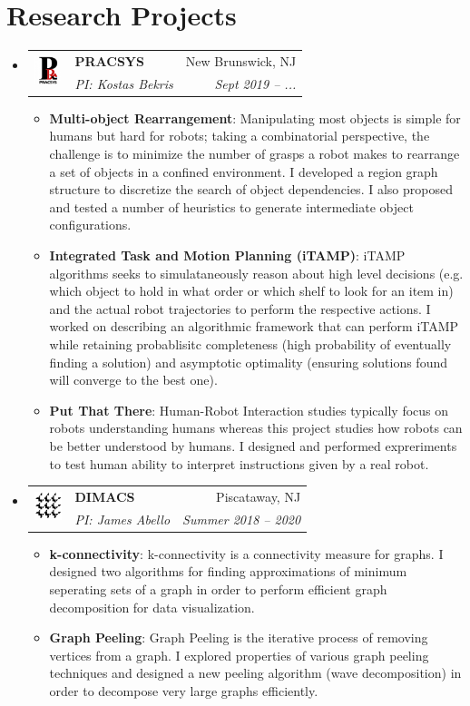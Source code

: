 \documentclass[letterpaper,11pt]{article}
\makeatletter
\newcommand{\resumeItem}[2]{
\item\small{
		\textbf{#1}{: #2 \vspace{-2pt}}
	}
}
\newcommand{\resumeSubheading}[5]{
	\vspace{-1pt}\item
	\begin{tabular*}{0.97\textwidth}[t]{ll@{\extracolsep{\fill}}r}
		\multirow{2}{*}{#1} & \textbf{#2} & #3 \\
				    & \textit{\small#4} & \textit{\small #5} \\
	\end{tabular*}\vspace{-5pt}
}
\newcommand{\resumeSubHeadingListStart}{\begin{itemize}[leftmargin=*,label=]}
\newcommand{\resumeSubHeadingListEnd}{\end{itemize}}
\newcommand{\resumeItemListStart}{\begin{itemize}[label=$\bullet$]}
\newcommand{\resumeItemListEnd}{\end{itemize}\vspace{-5pt}}
\makeatother
\begin{document}
\section{Research Projects}
\resumeSubHeadingListStart
\resumeSubheading
{\includegraphics[width=23pt]{./images/pracsys.png}}
{PRACSYS}{New Brunswick, NJ}
{PI: Kostas Bekris}{Sept 2019 -- ...}
\resumeItemListStart
\resumeItem{Multi-object Rearrangement}
{Manipulating most objects is simple for humans but hard for robots; taking a combinatorial perspective, the challenge is to minimize the number of grasps a robot makes to rearrange a set of objects in a confined environment. I developed a region graph structure to discretize the search of object dependencies. I also proposed and tested a number of heuristics to generate intermediate object configurations.}
\resumeItem{Integrated Task and Motion Planning (iTAMP)}
{iTAMP algorithms seeks to simulataneously reason about high level decisions (e.g. which object to hold in what order or which shelf to look for an item in) and the actual robot trajectories to perform the respective actions. I worked on describing an algorithmic framework that can perform iTAMP while retaining probablisitc completeness (high probability of eventually finding a solution) and asymptotic optimality (ensuring solutions found will converge to the best one).}
\resumeItem{Put That There}
{Human-Robot Interaction studies typically focus on robots understanding humans whereas this project studies how robots can be better understood by humans. I designed and performed expreriments to test human ability to interpret instructions given by a real robot.}
\resumeItemListEnd
\resumeSubheading
{\includegraphics[width=23pt]{./images/dimacs.png}}
{DIMACS}{Piscataway, NJ}
{PI: James Abello}{Summer 2018 -- 2020}
\resumeItemListStart
\resumeItem{k-connectivity}
{k-connectivity is a connectivity measure for graphs. I designed two algorithms for finding approximations of minimum seperating sets of a graph in order to perform efficient graph decomposition for data visualization.}
\resumeItem{Graph Peeling}
{Graph Peeling is the iterative process of removing vertices from a graph. I explored properties of various graph peeling techniques and designed a new peeling algorithm (wave decomposition) in order to decompose very large graphs efficiently.}
\resumeItemListEnd
\resumeSubHeadingListEnd
\end{document}
